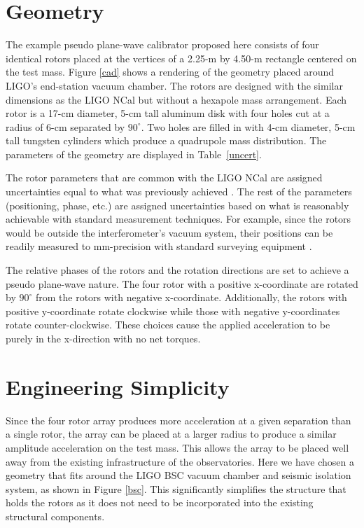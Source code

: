 \documentclass[superscriptaddress, twocolumn, prd]{revtex4-1}
\begin{document}
\section{Geometry}

The example pseudo plane-wave calibrator proposed here consists of four identical rotors placed at the vertices of a 2.25-m by 4.50-m rectangle centered on the test mass. Figure \ref{cad} shows a rendering of the geometry placed around LIGO's end-station vacuum chamber. The rotors are designed with the similar dimensions as the LIGO NCal \cite{ncal} but without a hexapole mass arrangement. Each rotor is a 17-cm diameter, 5-cm tall aluminum disk with four holes cut at a radius of 6-cm separated by $90^\circ$. Two holes are filled in with 4-cm diameter, 5-cm tall  tungsten cylinders which produce a quadrupole mass distribution. The parameters of the geometry are displayed in Table~\ref{uncert}.

The rotor parameters that are common with the LIGO NCal are assigned uncertainties equal to what was previously achieved \cite{ncal}. The rest of the parameters (positioning, phase, etc.) are assigned uncertainties based on what is reasonably achievable with standard measurement techniques. For example, since the rotors would be outside the interferometer's vacuum system, their positions can be readily measured to  mm-precision with standard surveying equipment \cite{ncal}.

The relative phases of the rotors and the rotation directions are set to achieve a pseudo plane-wave nature. The four rotor with a positive x-coordinate are rotated by $90^\circ$ from the rotors with negative x-coordinate. Additionally, the rotors with positive y-coordinate rotate clockwise while those with negative y-coordinates rotate counter-clockwise. These choices cause the applied acceleration to be purely in the x-direction with no net torques.

\section{Engineering Simplicity}

Since the four rotor array produces more acceleration at a given separation than a single rotor, the array can be placed at a larger radius to produce a similar amplitude acceleration on the test mass. This allows the array to be placed well away from the existing infrastructure of the observatories. Here we have chosen a geometry that fits around the LIGO BSC vacuum chamber and seismic isolation system, as shown in Figure \ref{bsc}. This significantly simplifies the structure that holds the rotors as it does not need to be incorporated into the existing structural components. 
\end{document}
